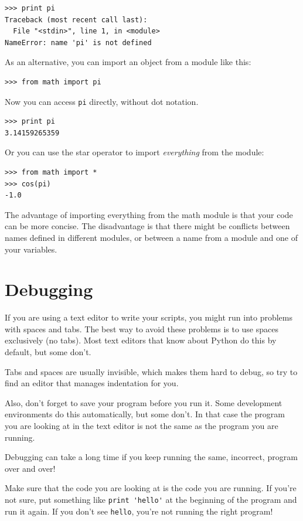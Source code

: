 \documentclass[10pt]{book}
\begin{document}
\begin{verbatim}
>>> print pi
Traceback (most recent call last):
  File "<stdin>", line 1, in <module>
NameError: name 'pi' is not defined
\end{verbatim}
%
As an alternative, you can import an object from a module like this:

\begin{verbatim}
>>> from math import pi
\end{verbatim}
%
Now you can access {\tt pi} directly, without dot notation.

\begin{verbatim}
>>> print pi
3.14159265359
\end{verbatim}
%
Or you can use the star operator to import {\it everything} from the
module:

\begin{verbatim}
>>> from math import *
>>> cos(pi)
-1.0
\end{verbatim}

The advantage of importing everything from the math module is that your
code can be more concise.  The disadvantage is that there might be
conflicts between names defined in different modules, or between
a name from a module and one of your variables.


\section{Debugging}
\label{editor}

If you are using a text editor to write your scripts, you might
run into problems with spaces and tabs.  The best way to avoid
these problems is to use spaces exclusively (no tabs).  Most text
editors that know about Python do this by default, but some
don't.

Tabs and spaces are usually invisible, which makes them
hard to debug, so try to find an editor that manages indentation
for you.

Also, don't forget to save your program before you run it.  Some
development environments do this automatically, but some don't.
In that case the program you are looking at in the text editor
is not the same as the program you are running.

Debugging can take a long time if you keep running the same,
incorrect, program over and over!

Make sure that the code you are looking at is the code you are running.
If you're not sure, put something like \verb"print 'hello'" at the
beginning of the program and run it again.  If you don't see
\verb"hello", you're not running the right program!
\end{document}
